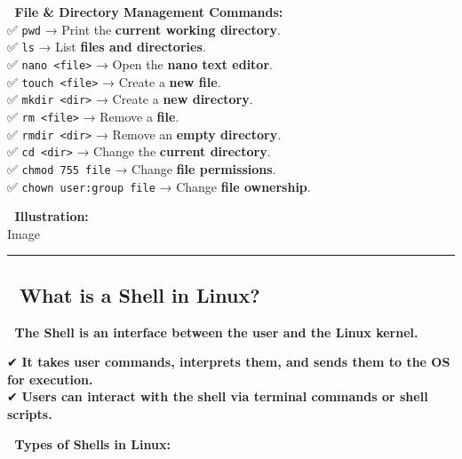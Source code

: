 \documentclass[
]{article}
\begin{document}
📌 \textbf{File \& Directory Management Commands:}\\
✅ \texttt{pwd} → Print the \textbf{current working directory}.\\
✅ \texttt{ls} → List \textbf{files and directories}.\\
✅ \texttt{nano\ \textless{}file\textgreater{}} → Open the \textbf{nano
text editor}.\\
✅ \texttt{touch\ \textless{}file\textgreater{}} → Create a \textbf{new
file}.\\
✅ \texttt{mkdir\ \textless{}dir\textgreater{}} → Create a \textbf{new
directory}.\\
✅ \texttt{rm\ \textless{}file\textgreater{}} → Remove a
\textbf{file}.\\
✅ \texttt{rmdir\ \textless{}dir\textgreater{}} → Remove an
\textbf{empty directory}.\\
✅ \texttt{cd\ \textless{}dir\textgreater{}} → Change the
\textbf{current directory}.\\
✅ \texttt{chmod\ 755\ file} → Change \textbf{file permissions}.\\
✅ \texttt{chown\ user:group\ file} → Change \textbf{file ownership}.

📌 \textbf{Illustration:}\\
{Image}

\begin{center}\rule{0.5\linewidth}{0.5pt}\end{center}

\subsection{\texorpdfstring{\textbf{📌 What is a Shell in
Linux?}}{📌 What is a Shell in Linux?}}\label{what-is-a-shell-in-linux}

📌 \textbf{The Shell is an interface between the user and the Linux
kernel.}

✔ \textbf{It takes user commands, interprets them, and sends them to the
OS for execution.}\\
✔ \textbf{Users can interact with the shell via terminal commands or
shell scripts.}

📌 \textbf{Types of Shells in Linux:}
\end{document}
